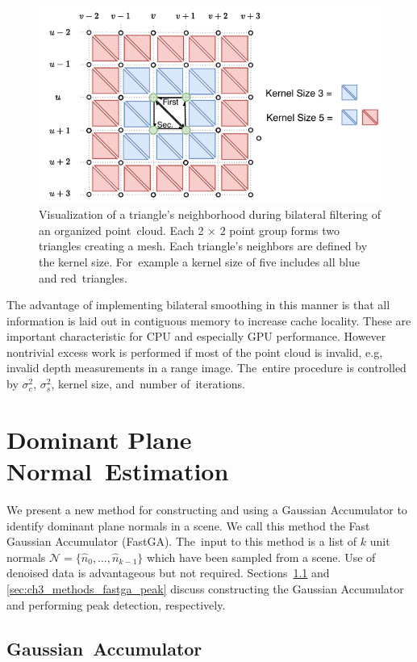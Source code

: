 \begin{figure}[H]
    \centering
    \includegraphics[width=.60\linewidth]{chapter_3_polylidar3d/imgs/OPCHalfEdge-BilateralFilter.pdf}
    \caption{Visualization of a triangle's neighborhood during bilateral filtering of an organized point~cloud.  Each 2 $\times$ 2 point group forms two triangles creating a mesh. Each triangle's neighbors are defined by the kernel size. For~example a kernel size of five includes all blue and red~triangles.}
    \label{fig:ch3_smooth_bilateral}
\end{figure}

The advantage of implementing bilateral smoothing in this manner is that all information is laid out in contiguous memory to increase cache locality. These are important characteristic for CPU and especially GPU performance. However nontrivial excess work is performed if most of the point cloud is invalid, e.g, invalid depth measurements in a range image. The~entire procedure is controlled by $\sigma_c^2$, $\sigma_s^2$, kernel size, and~number of~iterations.

\section{Dominant Plane Normal~Estimation}\label{sec:ch3_methods_fastga}

We present a new method for constructing and using a Gaussian Accumulator to identify dominant plane normals in a scene. We call this method the Fast Gaussian Accumulator (FastGA). The~input to this method is a list of $k$ unit normals $\mathcal{N} = \{\hat{n}_0, \ldots, \hat{n}_{k-1} \}$ which have been sampled from a scene. Use of denoised data is advantageous but not required. Sections~\ref{sec:ch3_methods_fastga_histogram} and \ref{sec:ch3_methods_fastga_peak} discuss constructing the Gaussian Accumulator and performing peak detection, respectively. 

\subsection{Gaussian~Accumulator}\label{sec:ch3_methods_fastga_histogram}

